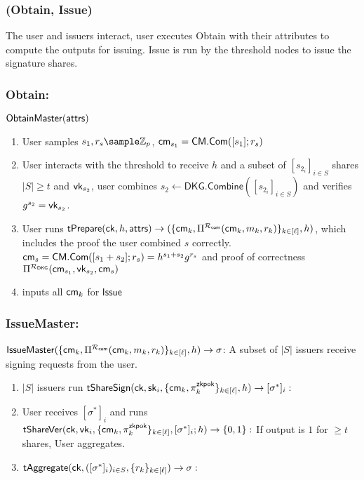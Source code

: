 \subsubsection*{(Obtain, Issue)}
The user and issuers interact, user executes Obtain with their attributes to compute the outputs for issuing. Issue is run by the threshold nodes to issue the signature shares.
\subsubsection*{Obtain:}
$\mathsf{ObtainMaster}(\mathsf{attrs})$
\begin{enumerate}
    \item User samples $s_1, r_s \sample \Z_p$, $\mathsf{cm}_{s_1} = \mathsf{CM.Com}([s_1];r_s)$
    \item User interacts with the threshold to receive $h$ and a subset of $[s_{2_i}]_{i \in S}$ shares $|S| \geq t$ and $\mathsf{vk}_{s_2}$, user combines $s_2 \gets \mathsf{DKG.Combine}([s_{2_i}]_{i \in S})$ and verifies $g^{s_2} = \mathsf{vk}_{s_2}$. 
    \item User runs $\mathsf{tPrepare}(\mathsf{ck}, h, \mathsf{attrs}) \to (\{\mathsf{cm}_k, \Pi^{\mathcal{R}_{\mathsf{com}}}(\mathsf{cm}_k, m_k, r_k)\}_{k \in [\ell]}, h)$, which includes the proof the user combined $s$ correctly. $\mathsf{cm}_s = \mathsf{CM.Com}([s_1 + s_2];r_s) = h^{s_1 + s_2}g^{r_s}$ and proof of correctness $\Pi^{\mathcal{R}_{\mathsf{DKG}}}(\mathsf{cm}_{s_1},  \mathsf{vk}_{s_2}, \mathsf{cm}_s)$
    \item inputs all $\mathsf{cm}_k$ for $\mathsf{Issue}$
\end{enumerate}

\subsubsection{IssueMaster:}
$\mathsf{IssueMaster}(\{\mathsf{cm}_k, \Pi^{\mathcal{R}_{\mathsf{com}}}(\mathsf{cm}_k, m_k, r_k)\}_{k \in [\ell]}, h) \to \sigma$: A subset of $|S|$ issuers receive signing requests from the user. 
\begin{enumerate}
    \item $|S|$ issuers run $\mathsf{tShareSign}(\mathsf{ck}, \mathsf{sk}_i, \{\mathsf{cm}_k, \pi_k^{\mathsf{zkpok}}\}_{k \in [\ell]}, h) \to [\sigma^*]_i:$
    \item User receives $[\sigma^*]_i$ and runs $\mathsf{tShareVer}(\mathsf{ck}, \mathsf{vk}_i, \{\mathsf{cm}_k, \pi_k^{\mathsf{zkpok}}\}_{k \in [\ell]}, [\sigma^*]_i; h) \to \{0,1\}:$ If output is $1$ for $\geq t$ shares, User aggregates.
    \item $\mathsf{tAggregate}(\mathsf{ck}, ([\sigma^*]_i)_{i \in S}, \{r_k\}_{k \in [\ell]}) \to \sigma:$
\end{enumerate}


